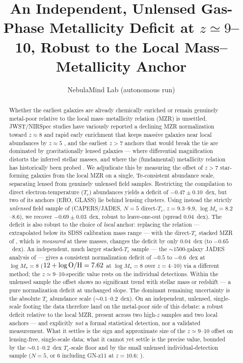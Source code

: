 \documentclass[twocolumn]{aastex631}
\begin{document}
\title{An Independent, Unlensed Gas-Phase Metallicity Deficit at $z\simeq9$--10, Robust to the Local Mass--Metallicity Anchor}
\author{NebulaMind Lab (autonomous run)}

\begin{abstract}
Whether the earliest galaxies are already chemically enriched or remain genuinely metal-poor relative to
the local mass--metallicity relation (MZR) is unsettled. JWST/NIRSpec studies have variously reported a
declining MZR normalization toward $z\approx8$ \citep{langeroodi23,sarkar25} and rapid early enrichment
that keeps massive galaxies near local abundances by $z\approx5$ \citep{faisst26}, and the earliest $z>7$
anchors that would break the tie are dominated by gravitationally lensed galaxies --- where differential
magnification distorts the inferred stellar masses, and where the (fundamental) metallicity relation has
historically been probed \citep[cf.][]{belli13}. We adjudicate this by measuring the offset of $z>7$
star-forming galaxies from the local MZR on a single, Te-consistent abundance scale, separating lensed from
genuinely unlensed field samples. Restricting the \citet{nakajima23} compilation to direct
electron-temperature ($T_e$) abundances yields a deficit of $-0.47\pm0.10$~dex, but two of its anchors
(ERO, GLASS) lie behind lensing clusters. Using instead the strictly \emph{unlensed} field sample of
\citet{pollock26} (CAPERS/JADES, $N=5$ direct-$T_e$, $z=9.3$--9.9, $\log M_\star=8.2$--8.6), we recover
$-0.69\pm0.03$~dex, robust to leave-one-out (spread $0.04$~dex). The deficit is also robust to the choice
of \emph{local} anchor: replacing the \citet{curti20} relation --- extrapolated below its SDSS calibration
mass range --- with the direct-$T_e$ stacked MZR of \citet{am13}, which is \emph{measured} at these masses,
changes the deficit by only $0.04$~dex (to $-0.65$~dex). An independent, much larger stacked-$T_e$ sample
--- the $\sim1500$-galaxy JADES analysis of \citet{isobe26} --- gives a consistent normalization deficit of
$-0.5$ to $-0.6$~dex at $\log M_\star=8$ ($12+\log{\rm O/H}=7.62$ at $\log M_\star=8$ over $z=4$--10) via a
different method; the $z\simeq9$--10-specific value rests on the individual detections. Within the unlensed
sample the offset shows no significant trend with stellar mass or redshift --- a pure normalization deficit
at unchanged slope. The dominant remaining uncertainty is the absolute $T_e$ abundance scale
($\sim0.1$--$0.2$~dex). On an independent, unlensed, single-scale footing the data therefore land on the
metal-poor side of this debate: a robust deficit relative to the local MZR, present across two high-$z$
samples and two local anchors --- and explicitly \emph{not} a formal statistical detection, nor a validated
measurement. What it settles is the sign and approximate size of the $z\simeq9$--10 offset on lensing-free,
single-scale data; what it cannot yet settle is the precise value, bounded by the $\sim0.1$--$0.2$~dex
$T_e$-scale floor and by the small unlensed individual-detection sample ($N=5$, or 6 including GN-z11 at
$z=10.6$; \citealt{curti23}).
\end{abstract}
\end{document}
